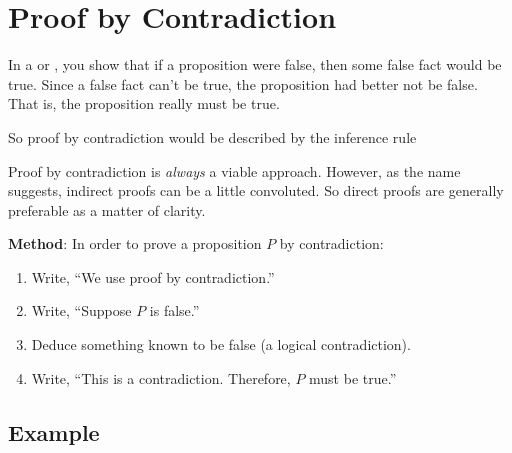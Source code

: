 \begin{problems}
\classproblems
{}
\homeworkproblems
{}
\end{problems}

\section{Proof by Contradiction}\label{contradiction_sec}

In a  or , you show that
if a proposition were false, then some false fact would be true.  Since a
false fact can't be true, the proposition had better not be false.  That
is, the proposition really must be true. 

\begin{editingnotes}

So proof by
contradiction would be described by the inference rule
\begin{rul*}
\end{rul*}

\end{editingnotes}

Proof by contradiction is \emph{always} a viable approach.  However, as
the name suggests, indirect proofs can be a little convoluted.  So direct
proofs are generally preferable as a matter of clarity.

\textbf{Method}: In order to prove a proposition $P$ by contradiction:

\begin{enumerate}

\item Write, ``We use proof by contradiction.''

\item Write, ``Suppose $P$ is false.''

\item Deduce something known to be false (a logical contradiction).

\item Write, ``This is a contradiction.  Therefore, $P$ must be
true.''

\end{enumerate}

\subsection*{Example}

